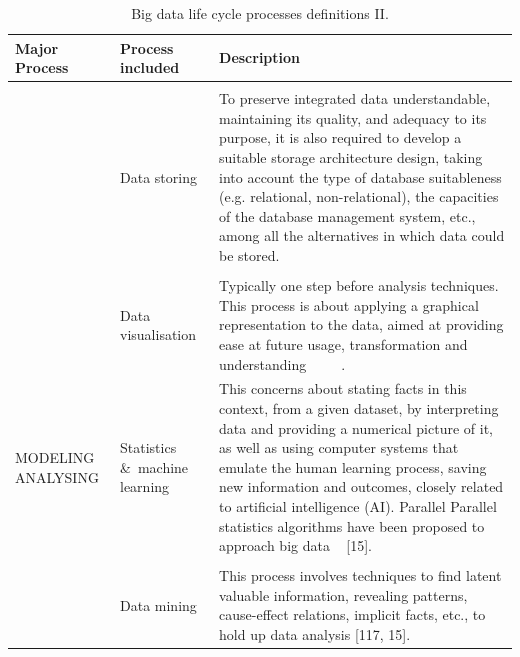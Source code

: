 \begin{table}[H]
    \caption{Big data life cycle processes definitions II.}
    \label{table:big_data_life_cyle_processes_definition_II}
    \centering
    \begin{tabular}{p{4.0cm} p{3.1cm} p{7cm}}
    \toprule
    \textbf{Major Process} & \textbf{Process included} & \textbf{Description} \\ 
    \bottomrule   
    & \\ &  Data storing & To preserve integrated data understandable, maintaining its quality, and
    adequacy to its purpose, it is also required to develop a suitable storage
    architecture design, taking into account the type of database suitableness (e.g. relational, non-relational),
    the capacities of the database management system, etc., among all the alternatives in which data could be stored. ~\cite{ComputingResearchAssociation}
    \\
    & \\ & Data visualisation & Typically one step before analysis
    techniques. This process is about applying a graphical representation to
    the data, aimed at providing ease at future usage, transformation and understanding ~\cite{Fayyad2002} ~\cite{Ware2012} ~\cite{Philip2014}.
    \\ 
    MODELING ANALYSING & Statistics \&\ machine learning & This concerns about stating facts in
    this context, from a given dataset, by interpreting data and providing a numerical picture of it, as well as using computer systems that emulate the human learning process, saving new information and outcomes,
    closely related to artificial intelligence (AI). Parallel Parallel statistics algorithms have been proposed to approach big data ~\cite{Ryszard2013} [15].
    \\
    & \\ & Data mining & This process involves techniques to
    find latent valuable information, revealing patterns, cause-effect relations, implicit facts, etc., to hold up
    data analysis [117, 15].
    \\
    \bottomrule
\end{tabular}
\end{table}

